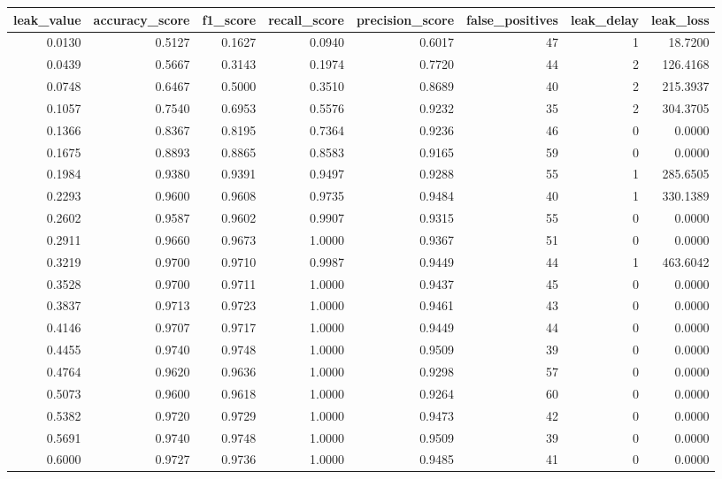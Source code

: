 \begin{tabular}{rrrrrrrr}
\toprule
leak\_value & accuracy\_score & f1\_score & recall\_score & precision\_score & false\_positives & leak\_delay & leak\_loss \\
\midrule
0.0130 & 0.5127 & 0.1627 & 0.0940 & 0.6017 & 47 & 1 & 18.7200 \\
0.0439 & 0.5667 & 0.3143 & 0.1974 & 0.7720 & 44 & 2 & 126.4168 \\
0.0748 & 0.6467 & 0.5000 & 0.3510 & 0.8689 & 40 & 2 & 215.3937 \\
0.1057 & 0.7540 & 0.6953 & 0.5576 & 0.9232 & 35 & 2 & 304.3705 \\
0.1366 & 0.8367 & 0.8195 & 0.7364 & 0.9236 & 46 & 0 & 0.0000 \\
0.1675 & 0.8893 & 0.8865 & 0.8583 & 0.9165 & 59 & 0 & 0.0000 \\
0.1984 & 0.9380 & 0.9391 & 0.9497 & 0.9288 & 55 & 1 & 285.6505 \\
0.2293 & 0.9600 & 0.9608 & 0.9735 & 0.9484 & 40 & 1 & 330.1389 \\
0.2602 & 0.9587 & 0.9602 & 0.9907 & 0.9315 & 55 & 0 & 0.0000 \\
0.2911 & 0.9660 & 0.9673 & 1.0000 & 0.9367 & 51 & 0 & 0.0000 \\
0.3219 & 0.9700 & 0.9710 & 0.9987 & 0.9449 & 44 & 1 & 463.6042 \\
0.3528 & 0.9700 & 0.9711 & 1.0000 & 0.9437 & 45 & 0 & 0.0000 \\
0.3837 & 0.9713 & 0.9723 & 1.0000 & 0.9461 & 43 & 0 & 0.0000 \\
0.4146 & 0.9707 & 0.9717 & 1.0000 & 0.9449 & 44 & 0 & 0.0000 \\
0.4455 & 0.9740 & 0.9748 & 1.0000 & 0.9509 & 39 & 0 & 0.0000 \\
0.4764 & 0.9620 & 0.9636 & 1.0000 & 0.9298 & 57 & 0 & 0.0000 \\
0.5073 & 0.9600 & 0.9618 & 1.0000 & 0.9264 & 60 & 0 & 0.0000 \\
0.5382 & 0.9720 & 0.9729 & 1.0000 & 0.9473 & 42 & 0 & 0.0000 \\
0.5691 & 0.9740 & 0.9748 & 1.0000 & 0.9509 & 39 & 0 & 0.0000 \\
0.6000 & 0.9727 & 0.9736 & 1.0000 & 0.9485 & 41 & 0 & 0.0000 \\
\bottomrule
\end{tabular}
